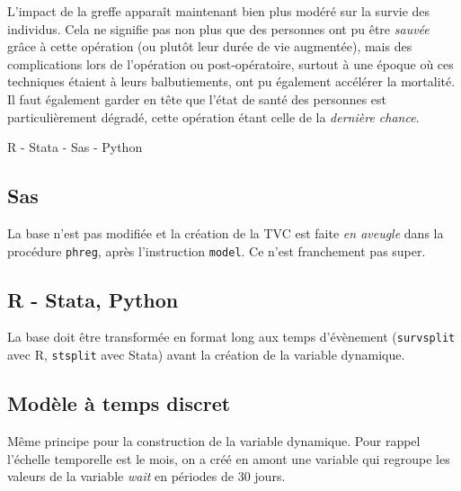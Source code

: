 \documentclass[
  12pt,
  letterpaper,
  DIV=11,
  numbers=noendperiod,
  onepage,
  openany]{scrreprt}
\begin{document}
L'impact de la greffe apparaît maintenant bien plus modéré sur la survie
des individus. Cela ne signifie pas non plus que des personnes ont pu
être \emph{sauvée} grâce à cette opération (ou plutôt leur durée de vie
augmentée), mais des complications lors de l'opération ou
post-opératoire, surtout à une époque où ces techniques étaient à leurs
balbutiements, ont pu également accélérer la mortalité. Il faut
également garder en tête que l'état de santé des personnes est
particulièrement dégradé, cette opération étant celle de la
\emph{dernière chance}.

R - Stata - Sas - Python

\subsection{Sas}

La base n'est pas modifiée et la création de la TVC est faite \emph{en
aveugle} dans la procédure \texttt{phreg}, après l'instruction
\texttt{model}. Ce n'est franchement pas super.

\subsection{R - Stata, Python}

La base doit être transformée en format long aux temps d'évènement
(\texttt{survsplit} avec R, \texttt{stsplit} avec Stata) avant la
création de la variable dynamique.

\hypertarget{moduxe8le-uxe0-temps-discret}{%
\subsection{Modèle à temps discret}\label{moduxe8le-uxe0-temps-discret}}

Même principe pour la construction de la variable dynamique. Pour rappel
l'échelle temporelle est le mois, on a créé en amont une variable qui
regroupe les valeurs de la variable \emph{wait} en périodes de 30 jours.
\end{document}
